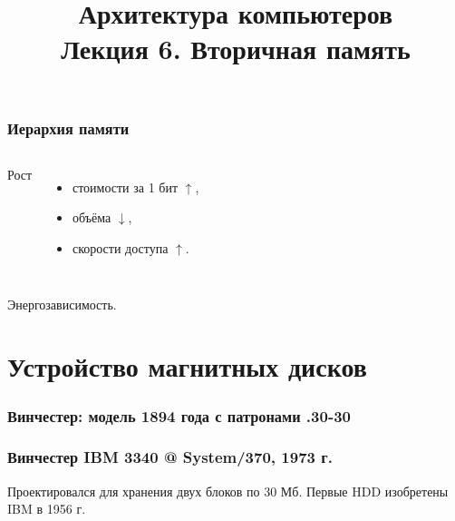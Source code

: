 \newcommand{\h}{}%



\title[Вторичная память]{Архитектура компьютеров\texorpdfstring{\\}{ }Лекция 6. Вторичная память}



\begin{frame}
\titlepage
\end{frame}


\begin{frame}
\frametitle{Иерархия памяти}
\vspace{-1cm}
\begin{columns}
    \column{7cm}

    \pause \column{4.5cm}
        Рост
        \begin{itemize}
            \item стоимости за 1 бит \pause $\uparrow$,\pause
            \item объёма \pause $\downarrow$,\pause
            \item скорости доступа \pause $\uparrow$.
        \end{itemize}
\end{columns}

\vspace{.5cm}
\pause Энергозависимость.
\end{frame}

\section{Устройство магнитных дисков}

\begin{frame}
\frametitle{Винчестер: модель 1894 года с патронами .30-30}
\end{frame}

\begin{frame}
\frametitle{Винчестер IBM 3340 @ System/370, 1973 г.}
Проектировался для хранения двух блоков по 30 Мб.
\pause Первые HDD изобретены IBM в 1956 г.
\end{frame}

